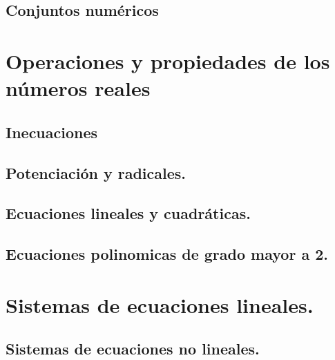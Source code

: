 \documentclass[
]{book}
\begin{document}
\hypertarget{conjuntos-numuxe9ricos}{%
\section{Conjuntos numéricos}\label{conjuntos-numuxe9ricos}}

\hypertarget{operaciones-y-propiedades-de-los-nuxfameros-reales}{%
\chapter{Operaciones y propiedades de los números reales}\label{operaciones-y-propiedades-de-los-nuxfameros-reales}}

\hypertarget{inecuaciones}{%
\section{Inecuaciones}\label{inecuaciones}}

\hypertarget{potenciaciuxf3n-y-radicales.}{%
\section{Potenciación y radicales.}\label{potenciaciuxf3n-y-radicales.}}

\hypertarget{ecuaciones-lineales-y-cuadruxe1ticas.}{%
\section{Ecuaciones lineales y cuadráticas.}\label{ecuaciones-lineales-y-cuadruxe1ticas.}}

\hypertarget{ecuaciones-polinomicas-de-grado-mayor-a-2.}{%
\section{Ecuaciones polinomicas de grado mayor a 2.}\label{ecuaciones-polinomicas-de-grado-mayor-a-2.}}

\hypertarget{sistemas-de-ecuaciones-lineales.}{%
\chapter{Sistemas de ecuaciones lineales.}\label{sistemas-de-ecuaciones-lineales.}}

\hypertarget{sistemas-de-ecuaciones-no-lineales.}{%
\section{Sistemas de ecuaciones no lineales.}\label{sistemas-de-ecuaciones-no-lineales.}}
\end{document}
